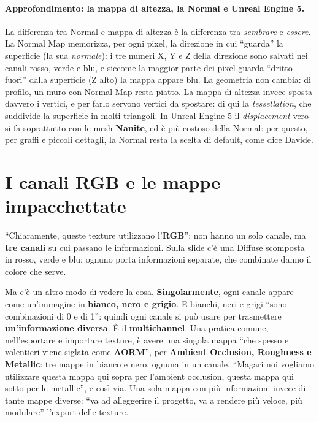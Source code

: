 \paragraph{Approfondimento: la mappa di altezza, la Normal e Unreal Engine 5.} La
differenza tra Normal e mappa di altezza è la differenza tra \emph{sembrare} e
\emph{essere}. La Normal Map memorizza, per ogni pixel, la direzione in cui ``guarda''
la superficie (la sua \emph{normale}): i tre numeri X, Y e Z della direzione sono
salvati nei canali rosso, verde e blu, e siccome la maggior parte dei pixel guarda
``dritto fuori'' dalla superficie (Z alto) la mappa appare blu. La geometria non
cambia: di profilo, un muro con Normal Map resta piatto. La mappa di altezza invece
sposta davvero i vertici, e per farlo servono vertici da spostare: di qui la
\emph{tessellation}, che suddivide la superficie in molti triangoli. In Unreal Engine 5
il \emph{displacement} vero si fa soprattutto con le mesh \textbf{Nanite}, ed è più
costoso della Normal: per questo, per graffi e piccoli dettagli, la Normal resta la
scelta di default, come dice Davide.

\section{I canali RGB e le mappe impacchettate}
\label{ue3:sec:canali}

``Chiaramente, queste texture utilizzano l'\textbf{RGB}'': non hanno un solo canale, ma
\textbf{tre canali} su cui passano le informazioni. Sulla slide c'è una Diffuse
scomposta in rosso, verde e blu: ognuno porta informazioni separate, che combinate
danno il colore che serve.

Ma c'è un altro modo di vedere la cosa. \textbf{Singolarmente}, ogni canale appare come
un'immagine in \textbf{bianco, nero e grigio}. E bianchi, neri e grigi ``sono
combinazioni di 0 e di 1'': quindi ogni canale si può usare per trasmettere
\textbf{un'informazione diversa}. È il \textbf{multichannel}. Una pratica comune,
nell'esportare e importare texture, è avere una singola mappa ``che spesso e volentieri
viene siglata come \textbf{AORM}'', per \textbf{Ambient Occlusion, Roughness e
Metallic}: tre mappe in bianco e nero, ognuna in un canale. ``Magari noi vogliamo
utilizzare questa mappa qui sopra per l'ambient occlusion, questa mappa qui sotto per
le metallic'', e così via. Una sola mappa con più informazioni invece di tante mappe
diverse: ``va ad alleggerire il progetto, va a rendere più veloce, più modulare''
l'export delle texture.

